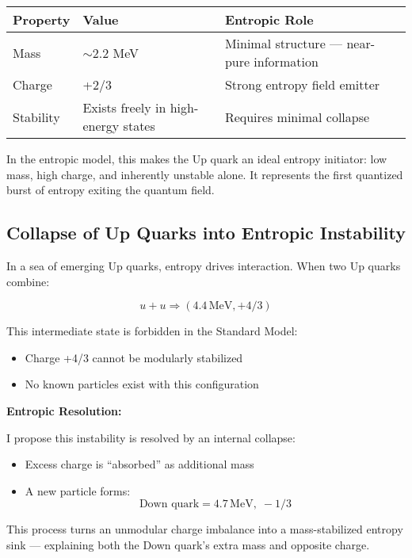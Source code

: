 \documentclass[12pt]{article}
\begin{document}
\vspace{0.5em}
\begin{center}
\begin{tabular}{|l|l|p{8cm}|}
\hline
\textbf{Property} & \textbf{Value} & \textbf{Entropic Role} \\
\hline
Mass & $\sim$2.2 MeV & Minimal structure — near-pure information \\
\hline
Charge & +2/3 & Strong entropy field emitter \\
\hline
Stability & Exists freely in high-energy states & Requires minimal collapse \\
\hline
\end{tabular}
\end{center}
\vspace{0.5em}

In the entropic model, this makes the Up quark an ideal entropy initiator: low mass, high charge, and inherently unstable alone. It represents the first quantized burst of entropy exiting the quantum field.

\subsection{Collapse of Up Quarks into Entropic Instability}

In a sea of emerging Up quarks, entropy drives interaction. When two Up quarks combine:

\[
u + u \Rightarrow (4.4\, \text{MeV}, +4/3)
\]

This intermediate state is forbidden in the Standard Model:
\begin{itemize}
    \item Charge +4/3 cannot be modularly stabilized
    \item No known particles exist with this configuration
\end{itemize}

\textbf{Entropic Resolution:}

I propose this instability is resolved by an internal collapse:
\begin{itemize}
    \item Excess charge is ``absorbed'' as additional mass
    \item A new particle forms:
\[
\text{Down quark} = 4.7 \, \text{MeV},\; -1/3
\]
\end{itemize}

This process turns an unmodular charge imbalance into a mass-stabilized entropy sink — explaining both the Down quark’s extra mass and opposite charge.
\end{document}
